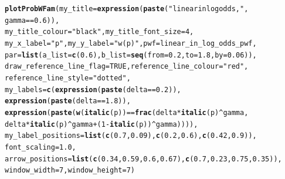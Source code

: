 \documentclass{article}\usepackage[]{graphicx}\usepackage[]{color}
\makeatletter
\newcommand{\hlnum}[1]{\textcolor[rgb]{0.686,0.059,0.569}{#1}}%
\newcommand{\hlstr}[1]{\textcolor[rgb]{0.192,0.494,0.8}{#1}}%
\newcommand{\hlopt}[1]{\textcolor[rgb]{0,0,0}{#1}}%
\newcommand{\hlstd}[1]{\textcolor[rgb]{0.345,0.345,0.345}{#1}}%
\newcommand{\hlkwc}[1]{\textcolor[rgb]{0.333,0.667,0.333}{#1}}%
\newcommand{\hlkwd}[1]{\textcolor[rgb]{0.737,0.353,0.396}{\textbf{#1}}}%
\newenvironment{kframe}{%
 \def\at@end@of@kframe{}%
 \ifinner\ifhmode%
  \def\at@end@of@kframe{\end{minipage}}%
  \begin{minipage}{\columnwidth}%
 \fi\fi%
 \def\FrameCommand##1{\hskip\@totalleftmargin \hskip-\fboxsep
 \colorbox{shadecolor}{##1}\hskip-\fboxsep
     \hskip-\linewidth \hskip-\@totalleftmargin \hskip\columnwidth}%
 \MakeFramed {\advance\hsize-\width
   \@totalleftmargin\z@ \linewidth\hsize
   \@setminipage}}%
 {\par\unskip\endMakeFramed%
 \at@end@of@kframe}
\newenvironment{knitrout}{}{} %
\makeatother
\begin{document}
\begin{knitrout}
\color{fgcolor}\begin{kframe}
\begin{alltt}
\hlkwd{plotProbWFam}\hlstd{(}\hlkwc{my_title}\hlstd{=}\hlkwd{expression}\hlstd{(}\hlkwd{paste}\hlstd{(}\hlstr{"linear in log odds,  "}\hlstd{,}
        \hlstd{gamma} \hlopt{==} \hlnum{0.6}\hlstd{)),}
        \hlkwc{my_title_colour}\hlstd{=}\hlstr{"black"}\hlstd{,} \hlkwc{my_title_font_size}\hlstd{=}\hlnum{4}\hlstd{,}
        \hlkwc{my_x_label} \hlstd{=} \hlstr{"p"}\hlstd{,} \hlkwc{my_y_label} \hlstd{=} \hlstr{"w(p)"}\hlstd{,} \hlkwc{pwf}\hlstd{=linear_in_log_odds_pwf,}
        \hlkwc{par}\hlstd{=}\hlkwd{list}\hlstd{(}\hlkwc{a_list}\hlstd{=}\hlkwd{c}\hlstd{(}\hlnum{0.6}\hlstd{),} \hlkwc{b_list}\hlstd{=}\hlkwd{seq}\hlstd{(}\hlkwc{from}\hlstd{=}\hlnum{0.2}\hlstd{,} \hlkwc{to}\hlstd{=}\hlnum{1.8}\hlstd{,} \hlkwc{by}\hlstd{=}\hlnum{0.06}\hlstd{)),}
        \hlkwc{draw_reference_line_flag}\hlstd{=}\hlnum{TRUE}\hlstd{,} \hlkwc{reference_line_colour}\hlstd{=}\hlstr{"red"}\hlstd{,}
        \hlkwc{reference_line_style}\hlstd{=}\hlstr{"dotted"}\hlstd{,}
        \hlkwc{my_labels}\hlstd{=}\hlkwd{c}\hlstd{(}\hlkwd{expression}\hlstd{(}\hlkwd{paste}\hlstd{(delta} \hlopt{==} \hlnum{0.2}\hlstd{)),}
                \hlkwd{expression}\hlstd{(}\hlkwd{paste}\hlstd{(delta} \hlopt{==} \hlnum{1.8}\hlstd{)),}
                \hlkwd{expression}\hlstd{(}\hlkwd{paste}\hlstd{(}\hlkwd{w}\hlstd{(}\hlkwd{italic}\hlstd{(p))} \hlopt{==} \hlkwd{frac}\hlstd{(delta} \hlopt{*} \hlkwd{italic}\hlstd{(p)}\hlopt{^}\hlstd{gamma,}
                        \hlstd{delta} \hlopt{*} \hlkwd{italic}\hlstd{(p)}\hlopt{^}\hlstd{gamma} \hlopt{+} \hlstd{(}\hlnum{1}\hlopt{-}\hlkwd{italic}\hlstd{(p))}\hlopt{^}\hlstd{gamma)))),}
        \hlkwc{my_label_positions}\hlstd{=}\hlkwd{list}\hlstd{(}\hlkwd{c}\hlstd{(}\hlnum{0.7}\hlstd{,}\hlnum{0.09}\hlstd{),}\hlkwd{c}\hlstd{(}\hlnum{0.2}\hlstd{,}\hlnum{0.6}\hlstd{),}\hlkwd{c}\hlstd{(}\hlnum{0.42}\hlstd{,} \hlnum{0.9}\hlstd{)),}
        \hlkwc{font_scaling}\hlstd{=}\hlnum{1.0}\hlstd{,}
        \hlkwc{arrow_positions} \hlstd{=} \hlkwd{list}\hlstd{(}\hlkwd{c}\hlstd{(}\hlnum{0.34}\hlstd{,}\hlnum{0.59}\hlstd{,}\hlnum{0.6}\hlstd{,}\hlnum{0.67}\hlstd{),}\hlkwd{c}\hlstd{(}\hlnum{0.7}\hlstd{,}\hlnum{0.23}\hlstd{,}\hlnum{0.75}\hlstd{,}\hlnum{0.35}\hlstd{)),}
        \hlkwc{window_width}\hlstd{=}\hlnum{7}\hlstd{,} \hlkwc{window_height}\hlstd{=}\hlnum{7}\hlstd{)}
\end{alltt}
\end{kframe}


\end{knitrout}
\end{document}
